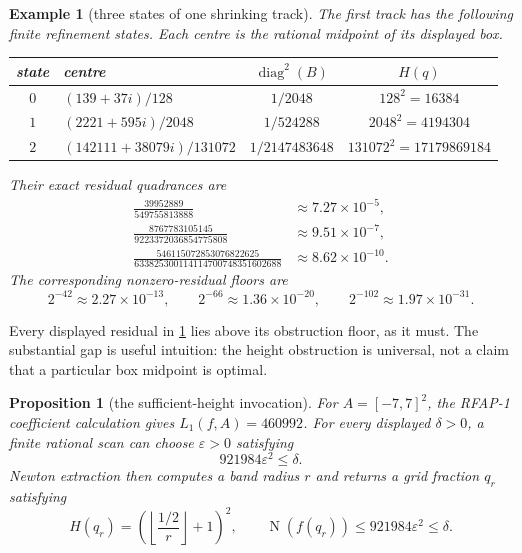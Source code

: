 \documentclass[11pt]{article}
\newtheorem{proposition}[proposition]{Proposition}
\newtheorem{example}[example]{Example}
\newcommand{\Norm}[1]{\operatorname{N}\!\left(#1\right)}
\newcommand{\diamq}{\operatorname{diag}^{2}}
\newcommand{\eps}{\varepsilon}
\begin{document}
\begin{example}[three states of one shrinking track]
\label{ex:cubic-track}
The first track has the following finite refinement states.  Each centre is
the rational midpoint of its displayed box.

\begin{center}
\small
\begin{tabularx}{\textwidth}{@{}c>{\raggedright\arraybackslash}Xcc@{}}
\toprule
state & centre & $\diamq(B)$ & $H(q)$\\
\midrule
$0$ & $(139+37i)/128$
    & $1/2048$ & $128^2=16384$\\
$1$ & $(2221+595i)/2048$
    & $1/524288$ & $2048^2=4194304$\\
$2$ & $(142111+38079i)/131072$
    & $1/2147483648$ & $131072^2=17179869184$\\
\bottomrule
\end{tabularx}
\end{center}

Their exact residual quadrances are
\[
 \begin{aligned}
 \frac{39952889}{549755813888}
   &\approx7.27\mathbin{\times}10^{-5},\\
 \frac{8767783105145}{9223372036854775808}
   &\approx9.51\mathbin{\times}10^{-7},\\
 \frac{546115072853076822625}{633825300114114700748351602688}
   &\approx8.62\mathbin{\times}10^{-10}.
 \end{aligned}
\]
The corresponding nonzero-residual floors are
\[
 2^{-42}\approx2.27\mathbin{\times}10^{-13},\qquad
 2^{-66}\approx1.36\mathbin{\times}10^{-20},\qquad
 2^{-102}\approx1.97\mathbin{\times}10^{-31}.
\]
\end{example}

Every displayed residual in \cref{ex:cubic-track} lies above its obstruction
floor, as it must.  The substantial gap is useful intuition: the height
obstruction is universal, not a claim that a particular box midpoint is
optimal.

\begin{proposition}[the sufficient-height invocation]
\label{prop:cubic-sufficient}
For $A=[-7,7]^2$, the RFAP-1 coefficient calculation gives
$L_1(f,A)=460992$.  For every displayed $\delta>0$, a finite rational scan
can choose $\eps>0$ satisfying
\[
                          921984\eps^2\le\delta.
\]
Newton extraction then computes a band radius $r$ and returns a grid fraction
$q_r$ satisfying
\[
 H(q_r)=\left(\left\lfloor\frac{1/2}{r}\right\rfloor+1\right)^2,
 \qquad \Norm{f(q_r)}\le921984\eps^2\le\delta.
\]
\end{proposition}
\end{document}
